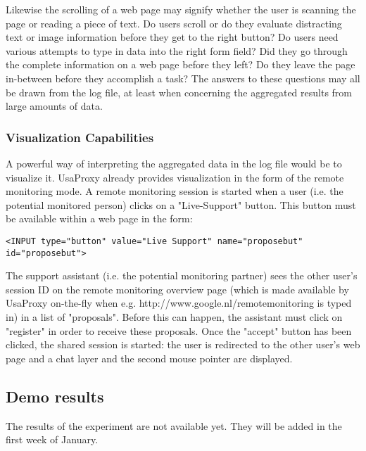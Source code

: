 Likewise the scrolling of a web page may signify whether the user is scanning the page or reading a piece of text. Do users scroll or do they evaluate distracting text or image information before they get to the right button? Do users need various attempts to type in data into the right form field?
Did they go through the complete information on a web page before they left? Do they leave the page in-between before they accomplish a task? The answers to these questions may all be drawn from the log file, at least when concerning the aggregated results from large amounts of data.

\subsubsection{Visualization Capabilities}
A powerful way of interpreting the aggregated data in the log file would be to visualize it. UsaProxy already provides visualization in the form of the remote monitoring mode. A remote monitoring session is started when a user (i.e. the potential monitored person) clicks on a "Live-Support" button. This button must be available within a web page in the form:
\begin{lstlisting}
<INPUT type="button" value="Live Support" name="proposebut" id="proposebut">
\end{lstlisting}

The support assistant (i.e. the potential monitoring partner) sees the other user's session ID on the remote monitoring overview page (which is made available by UsaProxy on-the-fly when e.g. http://www.google.nl/remotemonitoring is typed in) in a list of "proposals". Before this can happen, the assistant must click on "register" in order to receive these proposals. Once the "accept" button has been clicked, the shared session is started: the user is redirected to the other user's web page and a chat layer and the second mouse pointer are displayed. 

\subsection{Demo results}
The results of the experiment are not available yet. They will be added in the first week of January.